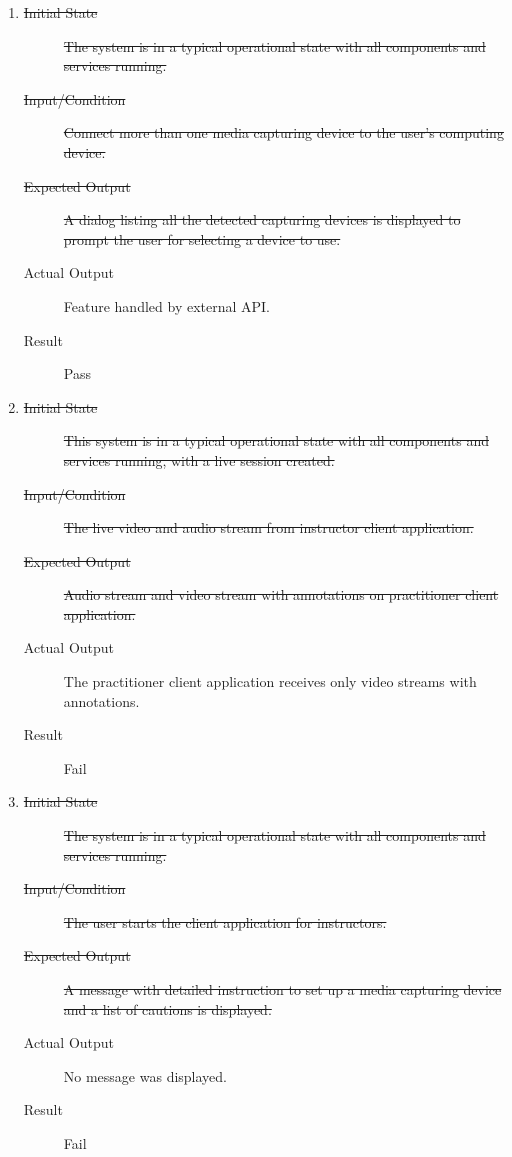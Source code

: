 \documentclass[12pt, titlepage]{article}
\begin{document}
\begin{enumerate}
\item \label{NFRT13}
  \begin{description}
  \item[\sout{Initial State}] \sout{The system is in a typical operational
      state with all components and services running.}
  \item[\sout{Input/Condition}] \sout{Connect more than one media capturing
      device to the user’s computing device.}
  \item[\sout{Expected Output}] \sout{A dialog listing all the detected
      capturing devices is displayed to prompt the user for selecting a
      device to use.}
  \item[Actual Output] Feature handled by external API.
  \item[Result] Pass
  \end{description}
\item \label{NFRT14}
  \begin{description}
  \item[\sout{Initial State}] \sout{This system is in a typical operational
      state with all components and services running, with a live session
      created.}
  \item[\sout{Input/Condition}] \sout{The live video and audio stream from
      instructor client application.}
  \item[\sout{Expected Output}] \sout{Audio stream and video stream with
      annotations on practitioner client application.}
  \item[Actual Output] The practitioner client application receives only video
    streams with annotations.
  \item[Result] Fail
  \end{description}
\item \label{NFRT15}
  \begin{description}
  \item[\sout{Initial State}] \sout{The system is in a typical operational
      state with all components and services running.}
  \item[\sout{Input/Condition}] \sout{The user starts the client application
      for instructors.}
  \item[\sout{Expected Output}] \sout{A message with detailed instruction to
      set up a media capturing device and a list of cautions is displayed.}
  \item[Actual Output] No message was displayed.
  \item[Result] Fail
  \end{description}
\end{enumerate}
\end{document}
